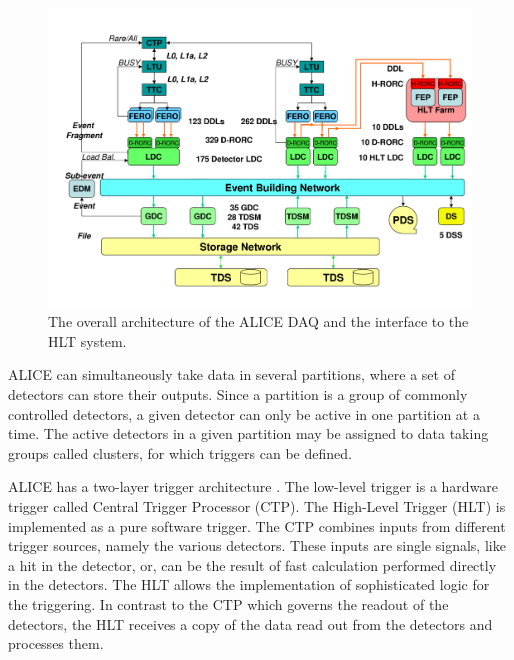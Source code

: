 \begin{figure}[htbp]
\begin{center}
\includegraphics[width=14.cm]{./Version1/FigChapter4/FigureDAQ}
\caption{The overall architecture of the ALICE DAQ and the interface to the HLT system.}
\label{fig:daq}
\end{center}
\end{figure}

 ALICE can simultaneously take data in several partitions, where a set of detectors can store their outputs. Since a partition is a group of commonly controlled detectors, a given detector can only be active in one partition at a time. The active detectors in a given partition may be assigned to data taking groups called clusters, for which triggers can be defined. 
 
ALICE has a two-layer trigger architecture \cite{cite:daq}. The low-level trigger is a hardware trigger called Central Trigger Processor (CTP). The High-Level Trigger (HLT) is implemented as a pure software trigger. The CTP combines inputs from different trigger sources, namely the various detectors. These inputs are single signals, like a hit in the detector, or, can be the result of fast calculation performed directly in the detectors. The HLT allows the implementation of sophisticated logic for the triggering. In contrast to the CTP which governs the readout of the detectors, the HLT receives a copy of the data read out from the detectors and processes them.

